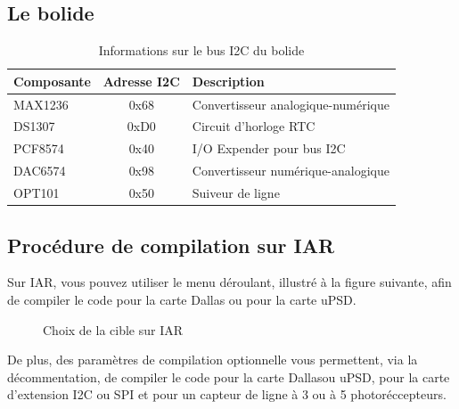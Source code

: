 \documentclass[10pt,a4paper,final]{article}
\begin{document}
\begin{spacing}{1.5}
\subsection{Le bolide}
\begin{table}[!ht]
\centering
\begin{tabular}{|l|c|l|}
\hline 
\textbf{Composante} & \textbf{Adresse I{\small 2}C} & \textbf{Description} \\ 
\hline 
MAX1236 & 0x68 & Convertisseur analogique-numérique \\ 
\hline 
DS1307  & 0xD0 & Circuit d'horloge RTC \\ 
\hline 
PCF8574 & 0x40 & I/O Expender pour bus I{\small 2}C \\ 
\hline 
DAC6574 & 0x98  & Convertisseur numérique-analogique  \\ 
\hline 
OPT101  &  0x50 & Suiveur de ligne  \\ 
\hline 
\end{tabular} 
\caption{Informations sur le bus I{\small 2}C du bolide}
\label{tab:testtab1}
\end{table}

\pagebreak
\subsection{Procédure de compilation sur IAR}
Sur IAR, vous pouvez utiliser le menu déroulant, illustré à la figure suivante, afin de compiler le code pour la carte Dallas ou pour la carte uPSD. 

\begin{figure}[hbtp]
\caption{Choix de la cible sur IAR}
\centering
{}
\end{figure}

De plus, des paramètres de compilation optionnelle vous permettent, via la décommentation, de compiler le code pour la carte Dallasou uPSD, pour la carte d'extension I2C ou SPI et pour un capteur de ligne à 3 ou à 5 photoréccepteurs.\\
\end{spacing}
\end{document}
